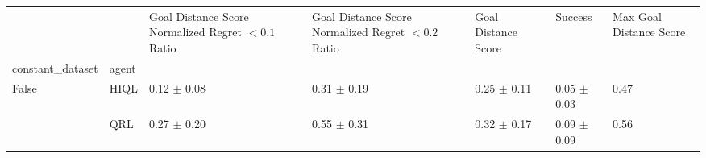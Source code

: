 \begin{tabular}{lllllll}
\toprule
 &  & Goal Distance Score Normalized Regret $< 0.1$ Ratio & Goal Distance Score Normalized Regret $< 0.2$ Ratio & Goal Distance Score & Success & Max Goal Distance Score \\
constant_dataset & agent &  &  &  &  &  \\
\midrule
\multirow[t]{2}{*}{False} & HIQL & 0.12 $\pm$ 0.08 & 0.31 $\pm$ 0.19 & 0.25 $\pm$ 0.11 & 0.05 $\pm$ 0.03 & 0.47 \\
 & QRL & 0.27 $\pm$ 0.20 & 0.55 $\pm$ 0.31 & 0.32 $\pm$ 0.17 & 0.09 $\pm$ 0.09 & 0.56 \\
\cline{1-7}
\bottomrule
\end{tabular}
